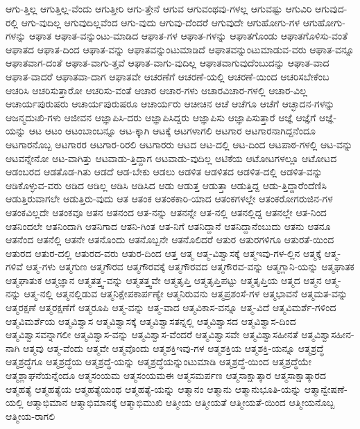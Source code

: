 {ಆಗು-ತ್ತಿಲ್ಲ
ಆಗುತ್ತಿಲ್ಲ-ವೆಂದು
ಆಗುತ್ತೀರಿ
ಆಗು-ತ್ತೇನೆ
ಆಗುವ
ಆಗುವಂಥವು-ಗಳಲ್ಲ
ಆಗುವಷ್ಟು
ಆಗುವಿರಿ
ಆಗುವುದ-ರಲ್ಲಿ
ಆಗು-ವುದಿಲ್ಲ
ಆಗುವುದಿಲ್ಲವೆಂದ
ಆಗು-ವುದು
ಆಗುವು-ದೆಂದರೆ
ಆಗುವುದೇ
ಆಗುಹೋಗು-ಗಳ
ಆಗುಹೋಗು-ಗಳನ್ನು
ಆಘಾತ
ಆಘಾತ-ವನ್ನುಂಟು-ಮಾಡಿದ
ಆಘಾತ-ಗಳ
ಆಘಾತ-ಗಳನ್ನು
ಆಘಾತಗೊಂಡು
ಆಘಾತಗೊಳಿಸು-ವಂತೆ
ಆಘಾತದ
ಆಘಾತ-ದಿಂದ
ಆಘಾತ-ವನ್ನು
ಆಘಾತವನ್ನುಂಟುಮಾಡಿದೆ
ಆಘಾತವನ್ನುಂಟುಮಾಡುವ-ವರು
ಆಘಾತ-ವನ್ನೂ
ಆಘಾತವಾಗ-ದಂತೆ
ಆಘಾತ-ವಾಗು-ತ್ತವೆ
ಆಘಾತ-ವಾಗು-ವುದಿಲ್ಲ
ಆಘಾತವಾಗುವುದೆಂಬುದನ್ನು
ಆಘಾತ-ವಾದ
ಆಘಾತ-ವಾದರೆ
ಆಘಾತವಾ-ದಾಗ
ಆಘಾತವೇ
ಆಚರಣೆಗೆ
ಆಚರಣೆ-ಯಲ್ಲಿ
ಆಚರಣೆ-ಯಿಂದ
ಆಚರಿಸಬೇಕೆಂಬ
ಆಚರಿಸಿ
ಆಚರಿಸುತ್ತಾರೋ
ಆಚರಿಸು-ವಂತೆ
ಆಚಾರ
ಆಚಾರ-ಗಳು
ಆಚಾರವಿಚಾರ-ಗಳಲ್ಲಿ
ಆಚಾರ-ವಿಲ್ಲ
ಆಚಾರ್ಯಪುರುಷರು
ಆಚಾರ್ಯಪುರುಷರೂ
ಆಚಾರ್ಯರು
ಆಚೀಚಿನ
ಆಚೆ
ಆಚೆಗೂ
ಆಚೆಗೆ
ಆಚ್ಛಾದನ-ಗಳನ್ನು
ಆಜನ್ಮದುಃಖಿ-ಗಳು
ಆಜೀವನ
ಆಜ್ಞಾಪಿಸಿ-ದರು
ಆಜ್ಞಾಪಿಸಿದ್ದರು
ಆಜ್ಞಾಪಿಸು
ಆಜ್ಞಾಪಿಸುತ್ತಾರೆ
ಆಜ್ಞೆ
ಆಜ್ಞೆಗೆ
ಆಜ್ಞೆ-ಯನ್ನು
ಆಟ
ಆಟಂ
ಆಟಂಬಾಂಬನ್ನೂ
ಆಟ-ಕ್ಕಾಗಿ
ಆಟಕ್ಕೆ
ಆಟಗಳಾಗಲಿ
ಆಟಗಾರ
ಆಟಗಾರನಾಗಿದ್ದನೆಂದೂ
ಆಟಗಾರನೊಬ್ಬ
ಆಟಗಾರರ
ಆಟಗಾರ-ರಿರಲಿ
ಆಟಗಾರರು
ಆಟದ
ಆಟ-ದಲ್ಲಿ
ಆಟ-ದಿಂದ
ಆಟಪಾಠ-ಗಳಲ್ಲಿ
ಆಟ-ವನ್ನು
ಆಟವನ್ನೇನೋ
ಆಟ-ವಾಗಿತ್ತು
ಆಟವಾಡು-ತ್ತಿದ್ದಾಗ
ಆಟವಾಡು-ವುದಿಲ್ಲ
ಆಟಿಕೆಯ
ಆಟೋಟಗಳಲ್ಲೂ
ಆಟೋಟದ
ಆಡಂಬರದ
ಆಡತೊಡ-ಗಿತು
ಆಡದೆ
ಆಡ-ಬೇಕು
ಆಡಲು
ಆಡಳಿತ
ಆಡಳಿತದ
ಆಡಳಿತ-ದಲ್ಲಿ
ಆಡಳಿತ-ವನ್ನು
ಆಡಿಕೊಳ್ಳುವ-ವರು
ಆಡಿದ
ಆಡಿಲ್ಲ
ಆಡಿಸಿ
ಆಡಿಸಿದ
ಆಡು
ಆಡುತ್ತ
ಆಡುತ್ತಾ
ಆಡುತ್ತಿದ್ದ
ಆಡು-ತ್ತಿದ್ದಾರೆಂದೆಣಿಸಿ
ಆಡುತ್ತಿರುವಾಗಲೇ
ಆಡುತ್ತಿರು-ವುದು
ಆತ
ಆತಂಕ
ಆತಂಕಕಾರಿ-ಯಾದ
ಆತಂಕಗಳಲ್ಲೇ
ಆತಂಕರೋಗರುಜಿನ-ಗಳ
ಆತಂಕವಿಲ್ಲದೇ
ಆತಂಕವೂ
ಆತನ
ಆತನಂದ
ಆತ-ನನ್ನು
ಆತನನ್ನೇ
ಆತ-ನಲ್ಲಿ
ಆತನಲ್ಲಿದ್ದ
ಆತನಲ್ಲೇ
ಆತ-ನಿಂದ
ಆತನಿಂದಲೇ
ಆತನಿಂದಾಗಿ
ಆತನಿಗಾದ
ಆತನಿ-ಗಿಂತ
ಆತ-ನಿಗೆ
ಆತನಿದ್ದಾನೆ
ಆತನಿದ್ದಾನೆಂಬುದು
ಆತನು
ಆತನೂ
ಆತನೆಂದ
ಆತನೆಲ್ಲಿ
ಆತನೇ
ಆತನೊಂದು
ಆತನೊಬ್ಬನೇ
ಆತನೊಲಿದರೆ
ಆತುರ
ಆತುರಗಳಿಗೂ
ಆತುರತೆ-ಯಿಂದ
ಆತುರದ
ಆತುರ-ದಲ್ಲಿ
ಆತುರದ-ವರು
ಆತುರ-ದಿಂದ
ಆತ್ತ
ಆತ್ಮ
ಆತ್ಮ-ವಿಶ್ವಾಸಕ್ಕೆ
ಆತ್ಮಇವು-ಗಳ-ಲ್ಲಿನ
ಆತ್ಮಕ್ಕೆ
ಆತ್ಮ-ಗಳಿವೆ
ಆತ್ಮ-ಗಳು
ಆತ್ಮಗುಣ
ಆತ್ಮಗೌರವ
ಆತ್ಮಗೌರವಕ್ಕೆ
ಆತ್ಮಗೌರವದ
ಆತ್ಮಗೌರವ-ವನ್ನು
ಆತ್ಮಗ್ಲಾನಿ-ಯನ್ನು
ಆತ್ಮಘಾತಕ
ಆತ್ಮಘಾತುಕ
ಆತ್ಮಜ್ಞಾನ
ಆತ್ಮತತ್ತ್ವ-ವನ್ನು
ಆತ್ಮತತ್ತ್ವವೇ
ಆತ್ಮತೃಪ್ತಿ
ಆತ್ಮತೃಪ್ತಿಪಟ್ಟು
ಆತ್ಮತೃಪ್ತಿಯ
ಆತ್ಮದ
ಆತ್ಮನ
ಆತ್ಮ-ನನ್ನು
ಆತ್ಮ-ನಲ್ಲಿ
ಆತ್ಮನಲ್ಲಿಡುವ
ಆತ್ಮನಿಕ್ಷೇಪಕಾರ್ಪಣ್ಯೇ
ಆತ್ಮನಿರುವನು
ಆತ್ಮಪ್ರಶಂಸೆ-ಗಳ
ಆತ್ಮಭಾವನೆ
ಆತ್ಮಮತ-ವನ್ನು
ಆತ್ಮರಕ್ಷಣೆ
ಆತ್ಮರಕ್ಷಣೆಗೆ
ಆತ್ಮರೂಪಿ
ಆತ್ಮ-ವನ್ನು
ಆತ್ಮ-ವಾದ
ಆತ್ಮವಿಕಾಸ-ವನ್ನೂ
ಆತ್ಮ-ವಿದೆ
ಆತ್ಮವಿಮರ್ಶೆ-ಗಳಿಂದ
ಆತ್ಮವಿಮರ್ಶೆಯ
ಆತ್ಮವಿಶ್ವಾಸ
ಆತ್ಮವಿಶ್ವಾಸಕ್ಕೆ
ಆತ್ಮವಿಶ್ವಾಸತನ್ನಲ್ಲಿ
ಆತ್ಮವಿಶ್ವಾಸದ
ಆತ್ಮವಿಶ್ವಾಸ-ದಿಂದ
ಆತ್ಮವಿಶ್ವಾಸವನ್ನಾಗಲೀ
ಆತ್ಮವಿಶ್ವಾಸ-ವನ್ನು
ಆತ್ಮವಿಶ್ವಾಸ-ವೆಂದರೆ
ಆತ್ಮವಿಶ್ವಾಸವೇ
ಆತ್ಮವಿಶ್ವಾಸಹೀನತೆ
ಆತ್ಮವಿಶ್ವಾಸಹೀನ-ನಾಗಿ
ಆತ್ಮವು
ಆತ್ಮ-ವೆಂದು
ಆತ್ಮವೇ
ಆತ್ಮವೊಂದು
ಆತ್ಮಶಕ್ತಿಇವು-ಗಳ
ಆತ್ಮಶಕ್ತಿಯ
ಆತ್ಮಶಕ್ತಿ-ಯನ್ನೂ
ಆತ್ಮಶ್ರದ್ಧೆ
ಆತ್ಮಶ್ರದ್ಧೆಗೂ
ಆತ್ಮಶ್ರದ್ಧೆಯ
ಆತ್ಮಶ್ರದ್ಧೆ-ಯನ್ನು
ಆತ್ಮಶ್ರದ್ಧೆಯನ್ನುಂಟುಮಾಡಿ
ಆತ್ಮಶ್ರದ್ಧೆ-ಯಿಂದ
ಆತ್ಮಶ್ರದ್ಧೆಯೇ
ಆತ್ಮಶ್ಲಾಘನೆಯನ್ನೆಂದೂ
ಆತ್ಮಸಂಯಮ
ಆತ್ಮಸಂಯಮಈ
ಆತ್ಮಸಮರ್ಪಣ
ಆತ್ಮಸಾಕ್ಷಾತ್ಕಾರ
ಆತ್ಮಸಾಕ್ಷಾತ್ಕಾರದ
ಆತ್ಮಹತ್ಯೆ
ಆತ್ಮಹತ್ಯೆಯ
ಆತ್ಮಹತ್ಯೆಯಂಥ
ಆತ್ಮಹತ್ಯೆ-ಯನ್ನು
ಆತ್ಮಾನಂ
ಆತ್ಮಾನು
ಆತ್ಮಾನುಭೂತಿ-ಯನ್ನು
ಆತ್ಮಾನ್ವೇಷಣೆ-ಯಲ್ಲಿ
ಆತ್ಮಾಭಿಮಾನ
ಆತ್ಮಾಭಿಮಾನಕ್ಕೆ
ಆತ್ಮಾಭಿಮುಖಿ
ಆತ್ಮೀಯ
ಆತ್ಮೀಯತೆ
ಆತ್ಮೀಯತೆ-ಯಿಂದ
ಆತ್ಮೀಯನೊಬ್ಬ
ಆತ್ಮೀಯ-ರಾಗಲಿ
}
